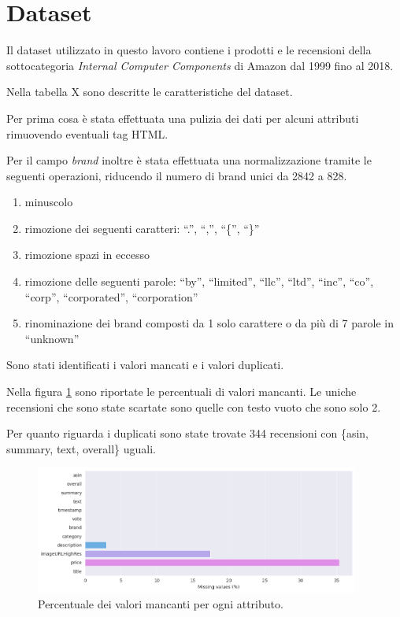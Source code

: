 \section{Dataset}
Il dataset utilizzato in questo lavoro contiene i prodotti e le recensioni della sottocategoria \textit{Internal Computer Components} di Amazon dal 1999 fino al 2018.

Nella tabella X sono descritte le caratteristiche del dataset. %

Per prima cosa è stata effettuata una pulizia dei dati per alcuni attributi rimuovendo eventuali tag HTML.

Per il campo \textit{brand} inoltre è stata effettuata una normalizzazione tramite le seguenti operazioni, riducendo
il numero di brand unici da 2842 a 828.
\begin{enumerate}
  \item minuscolo
  \item rimozione dei seguenti caratteri: ``.'', ``,'', ``\{'', ``\}''
  \item rimozione spazi in eccesso
  \item rimozione delle seguenti parole: ``by'', ``limited'', ``llc'', ``ltd'', ``inc'', ``co'', ``corp'', ``corporated'', ``corporation''
  \item rinominazione dei brand composti da 1 solo carattere o da più di 7 parole in ``unknown''
\end{enumerate}

Sono stati identificati i valori mancati e i valori duplicati.

Nella figura \ref{fig:missing_values} sono riportate le percentuali di valori mancanti. Le uniche recensioni che sono state 
scartate sono quelle con testo vuoto che sono solo 2.

Per quanto riguarda i duplicati sono state trovate 344 recensioni con \{asin, summary, text, overall\} uguali.

\begin{figure}[ht]
  \centering
  \includegraphics[width=0.95\textwidth]{images/dataset/missing_values.png}
  \caption{Percentuale dei valori mancanti per ogni attributo.}
  \label{fig:missing_values}
\end{figure}

